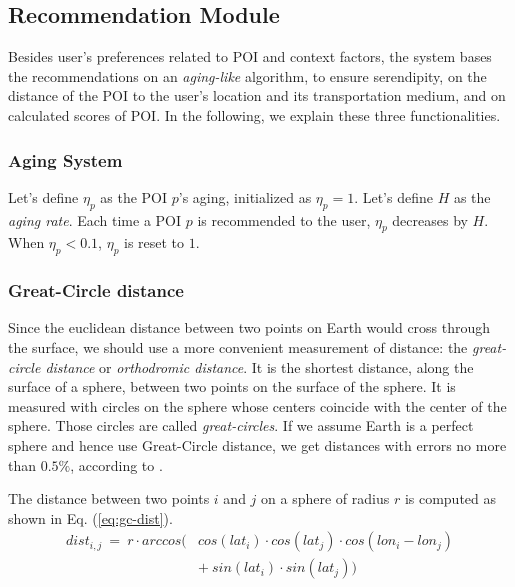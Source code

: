\subsection{Recommendation Module}


Besides user's preferences related to POI and context factors, the system bases the recommendations on  an {\it aging-like} algorithm,  to ensure serendipity, on the distance of the POI to the user's location and its transportation medium, and on calculated scores of POI. In the following, we explain these three functionalities.

\subsubsection{\bf Aging System}

Let's define $\eta_p$ as the POI $p$'s aging, initialized as $\eta_p = 1$. Let's define $H$ as the \textit{aging rate}. Each time a POI $p$ is recommended to the user, $\eta_p$ decreases by $H$. When $\eta_p < 0.1$, $\eta_p$ is reset to $1$. 

\subsubsection{\bf Great-Circle distance}
Since the euclidean distance between two points on Earth would cross through the surface, we should use a more convenient measurement of distance: the \textit{great-circle distance} or \textit{orthodromic distance}. It is the shortest distance, along the surface of a sphere, between two points on the surface of the sphere. It is measured with circles on the sphere whose centers coincide with the center of the sphere. Those circles are called \textit{great-circles}. If we assume Earth is a perfect sphere and hence use Great-Circle distance, we get distances with errors no more than $0.5\%$, according to \cite{1997admiralty}. 

The distance between two points $i$ and $j$ on a sphere of radius $r$ is computed as shown in Eq. (\ref{eq:gc-dist}).
\begin{equation} \label{eq:gc-dist}
    \begin{split}
        \scriptstyle{dist_{i,j} \ = \ r \cdot arccos (} & \scriptstyle{cos(lat_i) \cdot cos(lat_j) \cdot cos(lon_i - lon_j)} \\
                                        & \scriptstyle{+ \ sin(lat_i) \cdot sin(lat_j) )}
    \end{split}
\end{equation}

